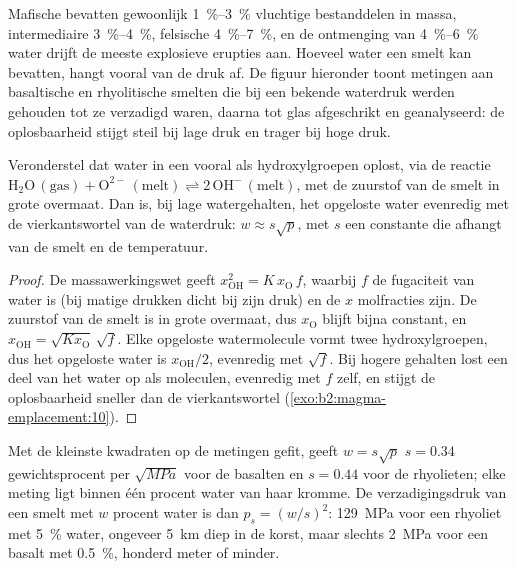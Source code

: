 Mafische  bevatten gewoonlijk \qtyrange{1}{3}{\percent} vluchtige bestanddelen in massa,
intermediaire  \qtyrange{3}{4}{\percent}, felsische 
\qtyrange{4}{7}{\percent}, en de ontmenging van \qtyrange{4}{6}{\percent}
water drijft de meeste explosieve erupties aan. Hoeveel water een smelt kan bevatten, hangt
vooral van de druk af. De figuur hieronder toont metingen aan basaltische en
rhyolitische smelten die bij een bekende waterdruk werden gehouden tot ze verzadigd waren, daarna tot glas
afgeschrikt en geanalyseerd: de oplosbaarheid stijgt steil bij lage druk en
trager bij hoge druk.

\begin{proposition}\label{prop:b2:magma-emplacement:sqrt}
Veronderstel dat water in een  vooral als hydroxylgroepen oplost, via
de reactie $\mathrm{H_2O\,(gas)} + \mathrm{O^{2-}\,(melt)} \rightleftharpoons
2\,\mathrm{OH^-\,(melt)}$, met de zuurstof van de smelt in grote overmaat. Dan is,
bij lage watergehalten, het opgeloste water evenredig met de vierkantswortel van
de waterdruk: $w \approx s\sqrt{p}$, met $s$ een constante die afhangt van de smelt en de
temperatuur.
\end{proposition}

\begin{proof}
De massawerkingswet geeft $x_{\mathrm{OH}}^2 = K\,x_{\mathrm{O}}\,f$, waarbij $f$
de fugaciteit van water is (bij matige drukken dicht bij zijn druk) en de $x$
molfracties zijn. De zuurstof van de smelt is in grote overmaat, dus
$x_{\mathrm{O}}$ blijft bijna constant, en $x_{\mathrm{OH}} = \sqrt{Kx_{\mathrm{O}}}\,
\sqrt f$. Elke opgeloste watermolecule vormt twee hydroxylgroepen, dus het opgeloste
water is $x_{\mathrm{OH}}/2$, evenredig met $\sqrt f$. Bij hogere gehalten lost een deel
van het water op als moleculen, evenredig met $f$ zelf, en stijgt de
oplosbaarheid sneller dan de vierkantswortel (\cref{exo:b2:magma-emplacement:10}).
\end{proof}

Met de kleinste kwadraten op de metingen gefit, geeft $w = s\sqrt p$
$s = 0.34$ gewichtsprocent per $\sqrt{\unit{MPa}}$ voor de basalten en
$s = 0.44$ voor de rhyolieten; elke meting ligt binnen één procent
water van haar kromme. De verzadigingsdruk van een smelt met $w$ procent
water is dan $p_s = (w/s)^2$: \qty{129}{MPa} voor een rhyoliet met
\qty{5}{\percent} water, ongeveer \qty{5}{km} diep in de korst, maar slechts
\qty{2}{MPa} voor een basalt met \qty{0.5}{\percent}, honderd meter of minder.

